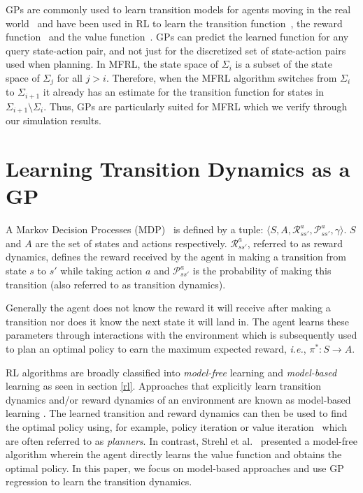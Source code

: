 \documentclass[12pt]{report}
\newcommand{\ie}{\textit{i.e.}}
\begin{document}
GPs are commonly used to learn transition models for agents moving in the real world~\cite{Dames2015} and have been used in RL to learn the transition function~\cite{rasmussen2003gaussian}, the reward function~\cite{deisenroth2010efficient} and the value function~\cite{engel2005reinforcement}. GPs can predict the learned function for any query state-action pair, and not just for the discretized set of state-action pairs used when planning. In MFRL, the state space of $\Sigma_i$ is a subset of the state space of $\Sigma_j$ for all $j>i$. Therefore, when the MFRL algorithm switches from $\Sigma_i$ to $\Sigma_{i+1}$ it already has an estimate for the transition function for states in $\Sigma_{i+1}\setminus\Sigma_{i}$. Thus, GPs are particularly suited for MFRL which we verify through our simulation results.


\section{Learning Transition Dynamics as a GP}
A Markov Decision Processes (MDP)~\cite{puterman2014markov} is defined by a tuple: $\langle S,A,\mathcal{R}_{ss'}^a,\mathcal{P}_{ss'}^a,\gamma\rangle$. $S$ and $A$ are the set of states and actions respectively. $\mathcal{R}_{ss'}^a$, referred to as reward dynamics, defines the reward received by the agent in making a transition from state $s$ to $s'$ while taking action $a$ and $\mathcal{P}_{ss'}^a$ is the probability of making this transition (also referred to as transition dynamics). 

Generally the agent does not know the reward it will receive after making a transition nor does it know the next state it will land in. The agent learns these parameters through interactions with the environment which is subsequently used to plan an optimal policy to earn the maximum expected reward, \ie, $\pi^{*}:S \rightarrow A$.

RL algorithms are broadly classified into \emph{model-free} learning and \emph{model-based} learning as seen in section \ref{rl}. Approaches that explicitly learn transition dynamics and/or reward dynamics of an environment are known as model-based learning \cite{brafman2002r,kearns2002near}. The learned transition and reward dynamics can then be used to find the optimal policy using, for example, policy iteration or value iteration~\cite{sutton1998reinforcement} which are often referred to as \emph{planners}. In contrast, Strehl et al.~\cite{strehl2006pac} presented a model-free algorithm wherein the agent directly learns the value function and obtains the optimal policy. In this paper, we focus on model-based approaches and use GP regression to learn the transition dynamics. 
\end{document}

